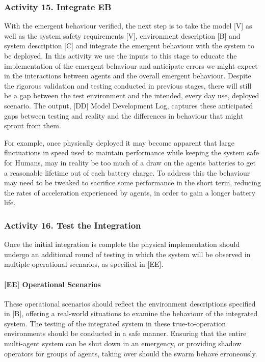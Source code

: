 \documentclass[lettersize,journal]{IEEEtran}
\begin{document}
\subsubsection*{Activity 15. Integrate EB}

With the emergent behaviour verified, the next step is to take the model [V] as well as the system safety requirements [V], environment description [B] and system description [C] and integrate the emergent behaviour with the system to be deployed. In this activity we use the inputs to this stage to educate the implementation of the emergent behaviour and anticipate errors we might expect in the interactions between agents and the overall emergent behaviour. Despite the rigorous validation and testing conducted in previous stages, there will still be a gap between the test environment and the intended, every day use, deployed scenario. The output, [DD] Model Development Log, captures these anticipated gaps between testing and reality and the differences in behaviour that might sprout from them.

For example, once physically deployed it may become apparent that large fluctuations in speed used to maintain performance while keeping the system safe for Humans, may in reality be too much of a draw on the agents batteries to get a reasonable lifetime out of each battery charge. To address this the behaviour may need to be tweaked to sacrifice some performance in the short term, reducing the rates of acceleration experienced by agents, in order to gain a longer battery life.

\subsubsection*{Activity 16. Test the Integration}

Once the initial integration is complete the physical implementation should undergo an additional round of testing in which the system will be observed in multiple operational scenarios, as specified in [EE].

\paragraph*{[EE] Operational Scenarios}

These operational scenarios should reflect the environment descriptions specified in [B], offering a real-world situations to examine the behaviour of the integrated system. The testing of the integrated system in these true-to-operation environments should be conducted in a safe manner. Ensuring that the entire multi-agent system can be shut down in an emergency, or providing shadow operators for groups of agents, taking over should the swarm behave erroneously.
\end{document}
